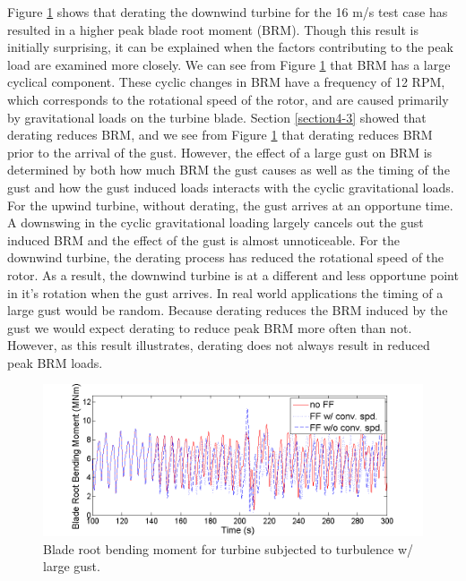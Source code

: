 Figure \ref{fig4-30} shows that derating the downwind turbine for the 16 m/s test case has resulted in a higher peak blade root moment (BRM). Though this result is initially surprising, it can be explained when the factors contributing to the peak load are examined more closely. We can see from Figure \ref{fig4-30} that BRM has a large cyclical component. These cyclic changes in BRM have a frequency of 12 RPM, which corresponds to the rotational speed of the rotor, and are caused primarily by gravitational loads on the turbine blade. Section \ref{section4-3} showed that derating reduces BRM, and we see from Figure \ref{fig4-30} that derating reduces BRM prior to the arrival of the gust. However, the effect of a large gust on BRM is determined by both how much BRM the gust causes as well as the timing of the gust and how the gust induced loads interacts with the cyclic gravitational loads. For the upwind turbine, without derating, the gust arrives at an opportune time. A downswing in the cyclic gravitational loading largely cancels out the gust induced BRM and the effect of the gust is almost unnoticeable. For the downwind turbine, the derating process has reduced the rotational speed of the rotor. As a result, the downwind turbine is at a different and less opportune point in it's rotation when the gust arrives. In real world applications the timing of a large gust would be random. Because derating reduces the BRM induced by the gust we would expect derating to reduce peak BRM more often than not. However, as this result illustrates, derating does not always result in reduced peak BRM loads.

\begin{figure}[htbp]
	\centering
		\includegraphics[trim = {1cm 0 2cm 0}, clip, width = \linewidth]{Figures/ch4Figures/fig4-30.png}
		
	\caption{Blade root bending moment for turbine subjected to turbulence w/ large gust.}
	\label{fig4-30}
\end{figure}

